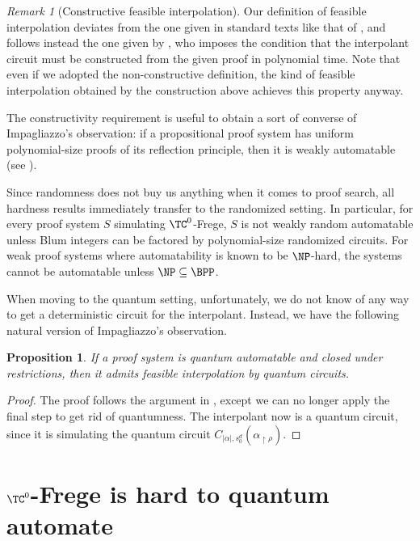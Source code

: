 \documentclass[11pt]{article}
\theoremstyle{definition}
\theoremstyle{plain}
\newtheorem{proposition}[definition]{Proposition}
\theoremstyle{remark}
\newtheorem{remark}[definition]{Remark}
\let\autocite\cite\let\textcite\citet
\begin{document}
\begin{remark}[Constructive feasible interpolation]
\label{rem:constructive}
    Our definition of feasible interpolation deviates from the one given in standard texts like that of \citeauthor{krajicekBOOK} \cite{krajicekBOOK}, and follows instead the one given by \citeauthor{pudlak03} \cite{pudlak03}, who imposes the condition that the interpolant circuit must be constructed from the given proof in polynomial time. Note that even if we adopted the non-constructive definition, the kind of feasible interpolation obtained by the construction above achieves this property anyway.

    The constructivity requirement is useful to obtain a sort of converse of Impagliazzo's observation: if a propositional proof system has uniform polynomial-size proofs of its reflection principle, then it is weakly automatable (see \autocite[Prop. 3.6]{pudlak03}).
\end{remark}

Since randomness does not buy us anything when it comes to proof search, all hardness results immediately transfer to the randomized setting. In particular, for every proof system $S$ simulating $\TC^0$-Frege, $S$ is not weakly random automatable unless Blum integers can be factored by polynomial-size randomized circuits. For weak proof systems where automatability is known to be $\NP$-hard, the systems cannot be automatable unless $\NP \subseteq \BPP$.

When moving to the quantum setting, unfortunately, we do not know of any way to get a deterministic circuit for the interpolant. Instead, we have the following natural version of Impagliazzo's observation.

\begin{proposition}
\label{prop:quant-impa}
    If a proof system is quantum automatable and closed under restrictions, then it admits feasible interpolation by quantum circuits. 
\end{proposition}

\begin{proof}
    The proof follows the argument in , except we can no longer apply the final step to get rid of quantumness. The interpolant now is a quantum circuit, since it is simulating the quantum circuit $C_{|\alpha|, {s_0^{d}}}(\alpha_{\restriction \rho})$.
\end{proof}


\section{$\TC^0$-Frege is hard to quantum automate}
\label{sec:outline}
\end{document}
